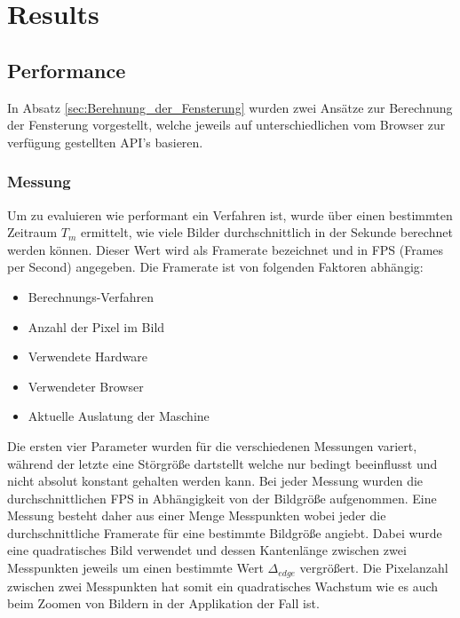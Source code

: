 
\section{Results}
\label{sec:results}

\subsection{Performance}
\label{sec:Performance}

In Absatz \ref{sec:Berehnung_der_Fensterung} wurden zwei Ansätze zur Berechnung der Fensterung vorgestellt,
welche jeweils auf unterschiedlichen vom Browser zur verfügung gestellten API's basieren.

\subsubsection{Messung}
Um zu evaluieren wie performant ein Verfahren ist,
wurde über einen bestimmten Zeitraum $T_m$ ermittelt, wie viele Bilder durchschnittlich in der Sekunde berechnet werden können.
Dieser Wert wird als Framerate bezeichnet und in FPS (Frames per Second) angegeben.
Die Framerate ist von folgenden Faktoren abhängig:
\begin{itemize}
	\item Berechnungs-Verfahren
	\item Anzahl der Pixel im Bild
	\item Verwendete Hardware
	\item Verwendeter Browser
	\item Aktuelle Auslatung der Maschine
\end{itemize}
Die ersten vier Parameter wurden für die verschiedenen Messungen variert, während der letzte eine Störgröße dartstellt welche nur bedingt beeinflusst und nicht absolut konstant gehalten werden kann.
Bei jeder Messung wurden die durchschnittlichen FPS in Abhängigkeit von der Bildgröße aufgenommen.
Eine Messung besteht daher aus einer Menge Messpunkten wobei jeder die durchschnittliche Framerate für eine bestimmte Bildgröße angiebt.
Dabei wurde eine quadratisches Bild verwendet und dessen Kantenlänge zwischen zwei Messpunkten jeweils um einen bestimmte Wert $\Delta_{edge}$ vergrößert.
Die Pixelanzahl zwischen zwei Messpunkten hat somit ein quadratisches Wachstum wie es auch beim Zoomen von Bildern in der Applikation der Fall ist.

